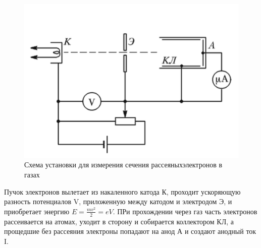 \documentclass[a4paper,14pt]{extarticle}
\begin{document}
\begin{figure}[h!]
	\centering
	\includegraphics[width = 0.7\linewidth]{scheme_513}
	\caption{Схема установки для измерения сечения рассеяныхэлектронов в газах}	
\end{figure}
Пучок электронов вылетает из накаленного катода К, проходит ускоряющую разность потенциалов V, приложенную между катодом и электродом Э, и приобретает энергию $E = \frac{mv^2}{2} = eV$. ПРи прохождении через газ часть электронов рассеивается на атомах, уходит в сторону и собирается коллектором КЛ, а прощедшие без рассеяния электроны попадают на анод А и создают анодный ток I. 
\end{document}
